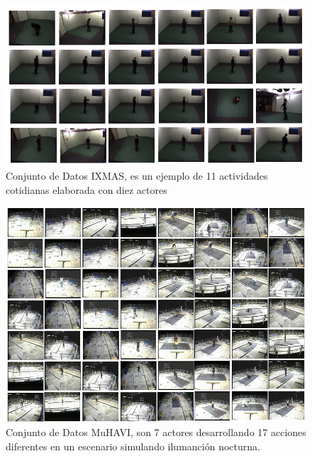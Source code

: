\begin{figure}[h!]
\centering
\includegraphics[scale=0.5]{img/ch2/ixmas}
\caption[IXMAS Dataset]{Conjunto de Datos IXMAS, es un ejemplo de 11 actividades cotidianas elaborada con diez actores}
\label{fig:ixmas}
\end{figure}

\begin{figure}[h!]
\centering
\includegraphics[scale=0.6]{img/ch2/MuHAVI}
\caption[MuHAVI Dataset]{Conjunto de Datos MuHAVI, son 7 actores desarrollando 17 acciones diferentes en un escenario simulando ilumanción nocturna.}
\label{fig:muhavi}
\end{figure}




